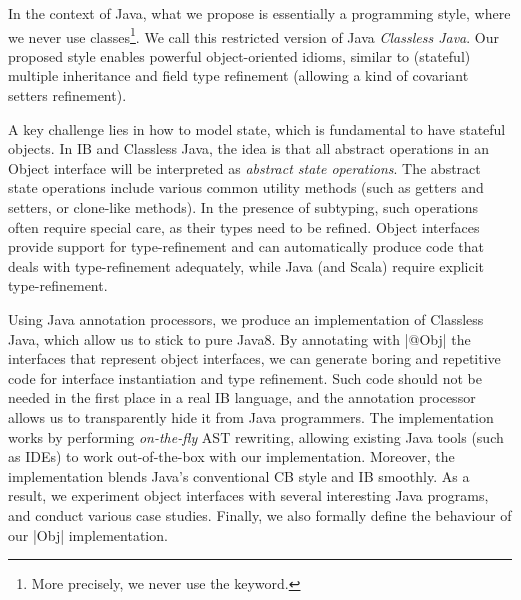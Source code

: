 

In the context of Java, what we propose is essentially a programming
style, where we never use classes\footnote{More precisely, we never
  use the \Q@class@ keyword.}.  We call this restricted version of
Java \emph{Classless Java}.  
Our proposed style enables powerful
object-oriented idioms, similar to (stateful) multiple inheritance and
field type refinement (allowing a kind of covariant setters
refinement).   


A key challenge lies in how to model state, which is fundamental to
have stateful objects. In IB and Classless Java, the idea is that all abstract operations in an Object
interface will be interpreted as \emph{abstract state operations}. The
abstract state operations include various common utility methods (such
as getters and setters, or clone-like methods). In the presence of
subtyping, such operations often require special care, as their types
need to be refined. Object interfaces provide support for
type-refinement and can automatically produce code that deals with
type-refinement adequately, while Java (and Scala) require explicit
type-refinement.


Using Java annotation processors, we produce an implementation of
Classless Java, which allow us to stick to pure Java8. By annotating
with \Q|@Obj| the interfaces that represent object interfaces, we can
generate boring and repetitive code for interface instantiation and
type refinement. Such code should not be needed in the first place in
a real IB language, and the annotation processor allows us to
transparently hide it from Java programmers. 
The implementation works by performing \emph{on-the-fly} AST
rewriting, allowing existing Java tools (such as IDEs) to work
out-of-the-box with our implementation. Moreover, the 
implementation blends Java's conventional CB style and IB smoothly. 
As a result, we experiment object interfaces with several interesting Java programs,
and conduct various case studies. 
Finally, we also formally define the behaviour of our \Q|Obj| implementation. 



